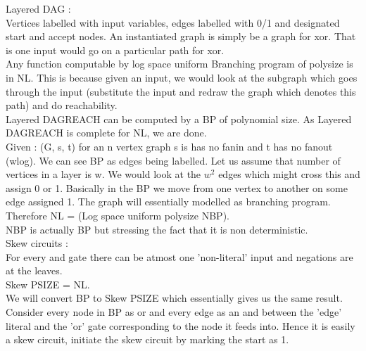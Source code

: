 \documentclass[solution,addpoints,12pt]{exam}
\begin{document}
Layered DAG :\\
Vertices labelled with input variables, edges labelled with 0/1 and
designated start and accept nodes. An instantiated graph is simply be
a graph for xor. That is one input would go on a particular path for xor.\\
Any function computable by log space uniform Branching program of
polysize is in NL. This is because given an input, we would look
at the subgraph which goes through the input (substitute the input
and redraw the graph which denotes this path) and do reachability.\\

Layered DAGREACH can be computed by a BP of polynomial size. As
Layered DAGREACH is complete for NL, we are done.\\
Given : (G, s, t) for an n vertex graph s is has no fanin
and t has no fanout (wlog). We can see BP as edges being labelled.
Let us assume that number of vertices in a layer is w. We would look
at the $w^2$ edges which might cross this and assign 0 or 1. Basically
in the BP we move from one vertex to another on some edge assigned 1. The
graph will essentially modelled as branching program.\\

Therefore NL = (Log space uniform polysize NBP).\\
NBP is actually BP but stressing the fact that it is non deterministic.\\

Skew circuits :\\
For every and gate there can be atmost one 'non-literal' input and
negations are at the leaves.\\
Skew PSIZE = NL.\\
We will convert BP to Skew PSIZE which essentially gives us the same result.\\
Consider every node in BP as or and every edge as an and between the 'edge' literal
and the 'or' gate corresponding to the node it feeds into. Hence it is
easily a skew circuit, initiate the skew circuit by marking the start as 1.\\
\end{document}
